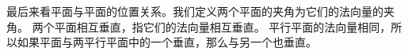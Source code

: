 \documentclass[12pt,UTF8,fontset=none]{ctexbook}
\begin{document}
\begin{so}
    
\end{so}

最后来看平面与平面的位置关系。我们定义两个平面的夹角为它们的法向量的夹角。
两个平面相互垂直，指它们的法向量相互垂直。
平行平面的法向量相同，所以如果平面与两平行平面中的一个垂直，那么与另一个也垂直。
\end{document}
